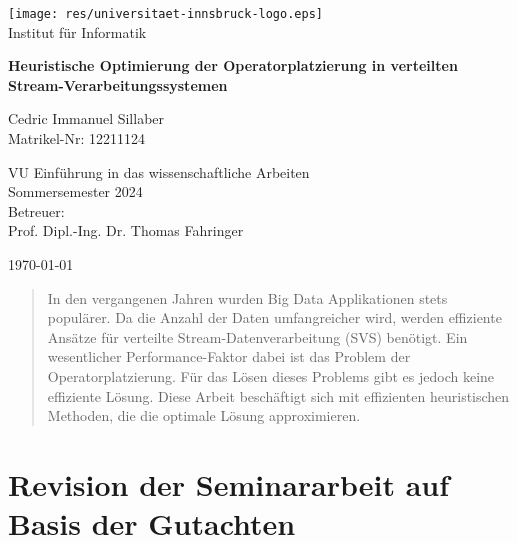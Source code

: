 \documentclass{article}
\begin{document}
\begin{titlepage}
      \begin{center}
          \Huge
          \vspace{1cm} %
          
          
          \texttt{[image: res/universitaet-innsbruck-logo.eps]} \\
          \Large
          Institut f\"ur Informatik \\
          \vspace{1cm}

          \Huge
          \textbf{Heuristische Optimierung der Operatorplatzierung in verteilten Stream-Verarbeitungssystemen} \\
          \vspace{3cm} %

          \Large
          Cedric Immanuel Sillaber \\
          Matrikel-Nr: 12211124
          
          \vspace{1cm}
          \large
          VU Einführung in das wissenschaftliche Arbeiten \\
          Sommersemester 2024\\
          \vspace{4cm}
          \normalsize
          Betreuer:\\ Prof. Dipl.-Ing. Dr. Thomas Fahringer
          
          \vfill 
          
          \large
          \today
      \end{center}
  \end{titlepage}
\begin{abstract}
In den vergangenen Jahren wurden Big Data Applikationen stets populärer. 
Da die Anzahl der Daten umfangreicher wird, werden effiziente Ansätze für 
verteilte Stream-Datenverarbeitung (SVS) benötigt.
Ein wesentlicher Performance-Faktor dabei ist das Problem der Operatorplatzierung.
Für das Lösen dieses Problems gibt es jedoch keine 
effiziente Lösung. Diese Arbeit beschäftigt sich mit effizienten heuristischen Methoden, die die optimale Lösung approximieren. 
\end{abstract}

\section{Revision der Seminararbeit auf Basis der Gutachten}
\end{document}
